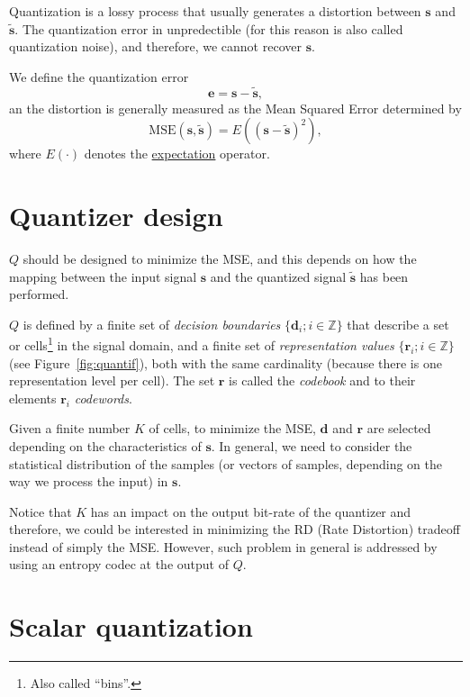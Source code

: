 Quantization is a lossy process that usually generates a distortion
between ${\mathbf s}$ and $\tilde{\mathbf s}$. The quantization error in unpredectible (for this reason is also called quantization noise), and therefore, we cannot recover ${\mathbf s}$.

We define the quantization error
\begin{equation}
  {\mathbf e} = {\mathbf s} - \tilde{{\mathbf s}},
\end{equation}
an the distortion is generally measured as the Mean Squared Error
determined by
\begin{equation}
  \text{MSE}({\mathbf s}, \tilde{\mathbf s}) = E(({\mathbf s} - \tilde{\mathbf s})^2),
  \label{eq:MSE}
\end{equation}
where $E(\cdot)$ denotes the
\href{https://en.wikipedia.org/wiki/Expected_value}{expectation}
operator.

\section{Quantizer design}

$Q$ should be designed to minimize the MSE, and this depends on how
the mapping between the input signal ${\mathbf s}$ and the quantized
signal $\tilde{\mathbf s}$ has been performed.

$Q$ is defined by a finite set of \emph{decision boundaries}
$\{{\mathbf d}_i; i\in {\mathbb{Z}}\}$ that describe a set or
cells\footnote{Also called ``bins''.} in the signal domain, and a
finite set of \emph{representation values} $\{{\mathbf r}_i; i\in
{\mathbb{Z}}\}$ (see Figure~\ref{fig:quantif}), both with the same
cardinality (because there is one representation level per cell). The
set ${\mathbf r}$ is called the \emph{codebook} and to their elements
${\mathbf r}_i$ \emph{codewords}.

Given a finite number $K$ of cells, to minimize the MSE, ${\mathbf d}$
and ${\mathbf r}$ are selected depending on the characteristics of
${\mathbf s}$. In general, we need to consider the statistical
distribution of the samples (or vectors of samples, depending on the
way we process the input) in ${\mathbf s}$.

Notice that $K$ has an impact on the output bit-rate of the quantizer
and therefore, we could be interested in minimizing the RD (Rate
Distortion) tradeoff instead of simply the MSE. However, such problem
in general is addressed by using an entropy codec at the output of
$Q$.

\section{Scalar quantization}

